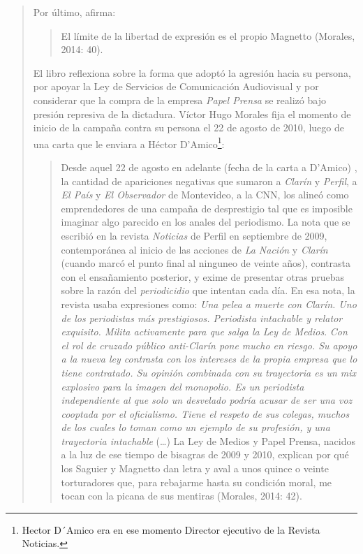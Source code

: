 \begin{quote}
Por último, afirma:

\begin{quote}
	El límite de la libertad de expresión es el propio Magnetto (Morales, 2014: 40).
\end{quote}


El libro reflexiona sobre la forma que adoptó la agresión hacia su persona, por apoyar la Ley de Servicios de Comunicación Audiovisual y por considerar que la compra de la empresa \emph{Papel Prensa} se realizó bajo presión represiva de la dictadura. Víctor Hugo Morales fija el momento de inicio de la campaña contra su persona el 22 de agosto de 2010, luego de una carta que le enviara a Héctor D'Amico\footnote{Hector D´Amico era en ese momento Director ejecutivo de la Revista Noticias.}:

\begin{quote}
	Desde aquel 22 de agosto en adelante (fecha de la carta a D'Amico) , la cantidad de apariciones negativas que sumaron a \emph{Clarín} y \emph{Perfil}, a \emph{El País }y \emph{El Observador} de Montevideo, a la CNN, los alineó como emprendedores de una campaña de desprestigio tal que es imposible imaginar algo parecido en los anales del periodismo. La nota que se escribió en la revista \emph{Noticias} de Perfil en septiembre de 2009, contemporánea al inicio de las acciones de \emph{La Nación} y \emph{Clarín} (cuando marcó el punto final al ninguneo de veinte años), contrasta con el ensañamiento posterior, y exime de presentar otras pruebas sobre la razón del \emph{periodicidio} que intentan cada día. En esa nota, la revista usaba expresiones como: \emph{Una pelea a muerte con Clarín. Uno de los periodistas más prestigiosos. Periodista intachable y relator exquisito. Milita activamente para que salga la Ley de Medios}. \emph{Con el rol de cruzado público anti-Clarín pone mucho en riesgo. Su apoyo a la nueva ley contrasta con los intereses de la propia empresa que lo tiene contratado. Su opinión combinada con su trayectoria es un mix explosivo para la imagen del monopolio. Es un periodista independiente al que solo un desvelado podría acusar de ser una voz cooptada por el oficialismo. Tiene el respeto de sus colegas, muchos de los cuales lo toman como un ejemplo de su profesión, y una trayectoria intachable} (\dots) La Ley de Medios y Papel Prensa, nacidos a la luz de ese tiempo de bisagras de 2009 y 2010, explican por qué los Saguier y Magnetto dan letra y aval a unos quince o veinte torturadores que, para rebajarme hasta su condición moral, me tocan con la picana de sus mentiras (Morales, 2014: 42).
\end{quote}



\end{quote}
